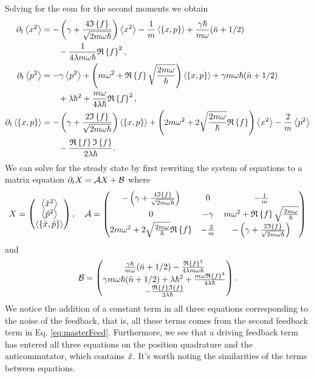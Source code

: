 Solving for the \gls{eom} for the second moments we obtain
\begin{align}
    \dt \expval{x^2} &= -\left(\gamma + \frac{4\im{f}}{\sqrt{2 m \omega \hbar}}\right) \expval{x^2} - \frac{1}{m} \expval{\acomm{x}{p}} + \frac{\gamma \hbar}{m \omega} (\nbar + 1/2) \nonumber\label{eq:x2Feedback} \\
    &\qquad - \frac{1}{4\lambda m \omega \hbar} \re{f}^2,\\
    \dt \expval{p^2} &=  -\gamma \expval{p^2} + \left( m\omega^2 + \re{f} \sqrt{\frac{2m \omega}{\hbar}} \right)\expval{\acomm{x}{p}} + \gamma m \omega \hbar (\nbar + 1/2) \nonumber \\
    &\qquad+ \lambda \hbar^2 + \frac{m \omega}{4 \lambda \hbar}\re{f}^2,\label{eq:p2Feedback} \\
    \dt \expval{\acomm{x}{p}} &= -\left(\gamma + \frac{2\im{f}}{\sqrt{2m \omega \hbar}}  \right)\expval{\acomm{x}{p}} + \left(2 m \omega^2 + 2 \sqrt{\frac{2 m \omega}{\hbar}}\re{f} \right) \expval{x^2} - \frac{2}{m} \expval{p^2}\nonumber\\ 
    &\qquad - \frac{\re{f} \im{f}}{2 \lambda \hbar}.\label{eq:xpFeedback}
\end{align}
We can solve for the steady state by first rewriting the system of equations to a matrix equation $\partial_t X = \mathcal{A} X + \mathcal{B}$ where
\begin{equation}
    X =
    \begin{pmatrix}
        \expval{\xop^2}\\
        \expval{\pop^2}\\
        \expval{\acomm{\xop}{\pop}}    
    \end{pmatrix}, \quad
    \mathcal{A} = \begin{pmatrix}
        -\left(\gamma + \frac{4\im{f}}{\sqrt{2 m \omega \hbar}}\right) & 0 & -\frac{1}{m} \\
        0 & -\gamma & m\omega^2 + \re{f} \sqrt{\frac{2m \omega}{\hbar}} \\
        2 m \omega^2 + 2 \sqrt{\frac{2 m \omega}{\hbar}}\re{f} & -\frac{2}{m} & -\left(\gamma +\frac{2\im{f}}{\sqrt{2m \omega \hbar}}\right) \label{eq:matrixA}
    \end{pmatrix}
\end{equation}
and
\begin{equation}
    \mathcal{B} = 
    \begin{pmatrix}
        \frac{\gamma \hbar}{m \omega} (\bar{n} + 1/2) - \frac{\mathfrak{R}\left\{f\right\}^2}{4\lambda m \omega \hbar}\\
        \gamma m \omega \hbar (\bar{n} + 1/2) + \lambda \hbar^2 +\frac{m \omega \mathfrak{R}\left\{f\right\}^2}{4 \lambda \hbar}\\
        -\frac{\mathfrak{R}\left\{f\right\} \mathfrak{I}\left\{f\right\}}{2 \lambda \hbar}
    \end{pmatrix}.
\end{equation}
We notice the addition of a constant term in all three equations corresponding to the noise of the feedback, that is, all these terms comes from the second feedback term in Eq. \eqref{eq:masterFeed}. Furthermore, we see that a driving feedback term has entered all three equations on the position quadrature and the anticommutator, which contains $\hat{x}$. It's worth noting the similarities of the terms between equations.

